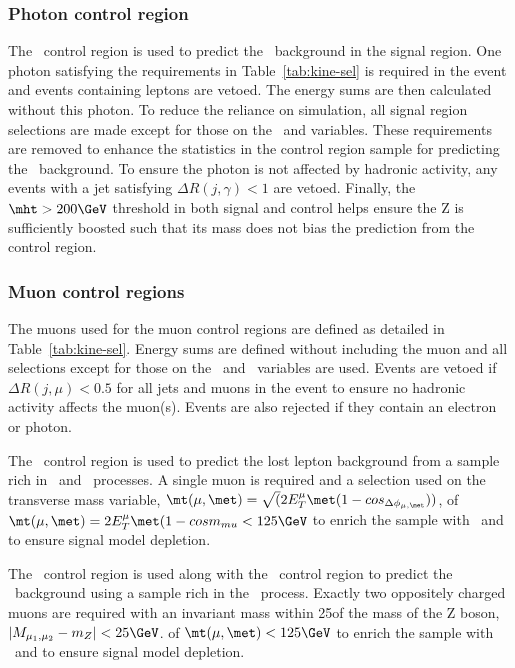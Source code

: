 \subsubsection{Photon control region}
The \gj~control region is used to predict the \znunu~background in the signal region.
One photon satisfying the requirements in Table~\ref{tab:kine-sel} is required in the 
event and events containing leptons are vetoed. The energy sums are then calculated without this photon. To reduce the reliance on simulation, 
all signal region selections are made except for those on the \bdphi~and \alphat variables.
These requirements are removed to enhance the statistics in the control region sample 
for predicting the \znunu~background. To ensure the photon is not affected by hadronic
activity, any events with a jet satisfying $\Delta R(j,\gamma) < 1$ are vetoed. Finally,
the $\mht > 200 \GeV$ threshold in both signal and control helps ensure the Z is sufficiently
boosted such that its mass does not bias the prediction from the \gj control region. 
\subsubsection{Muon control regions}
The muons used for the muon control regions are defined as detailed in
Table~\ref{tab:kine-sel}. Energy sums are defined without including the muon 
and all selections except for those on the \bdphi~and \alphat~variables are used.
Events are vetoed if $\Delta R(j,\mu) < 0.5$ for all jets and muons in the event to
ensure no hadronic activity affects the muon(s). Events are also rejected if they 
contain an electron or photon.

The \mj~control region is used to predict the lost lepton background from 
a sample rich in \wj~and \ttbar~processes. A single muon is required and a selection used on the transverse mass variable,
$\mt(\mu,\met) = \sqrt(2E^{\mu}_{T}\met(1-cos_{\Delta\phi_{\mu,\met}}))$,
of $\mt(\mu,\met) = 2E^{\mu}_{T}\met(1-cosm_{mu} < 125\GeV$ to enrich the sample with \wj~and to ensure signal model depletion.

The \mmj~control region is used along with the \gj~control region to predict the \znunu~background
using a sample rich in the \zmmj~process. Exactly two oppositely charged muons are required with
an invariant mass within 25\GeV of the mass of the Z boson, $|M_{\mu_1,\mu_2} - m_Z| < 25\GeV$.
of $\mt(\mu,\met) < 125\GeV$ to enrich the sample with \wj~and to ensure signal model depletion.





